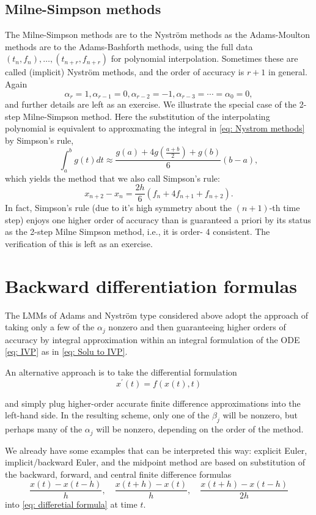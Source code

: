 \subsection{Milne-Simpson methods}
The Milne-Simpson methods are to the Nystr\"om methods as the Adams-Moulton methods are to the Adams-Bashforth methods, using the full data $\left(t_n, f_n\right), \ldots,\left(t_{n+r}, f_{n+r}\right)$ for polynomial interpolation. Sometimes these are called (implicit) Nystr\"om methods, and the order of accuracy is $r+1$ in general. Again
$$
\alpha_r=1, \alpha_{r-1}=0, \alpha_{r-2}=-1, \alpha_{r-3}=\cdots=\alpha_0=0,
$$
and further details are left as an exercise. We illustrate the special case of the 2-step Milne-Simpson method. Here the substitution of the interpolating polynomial is equivalent to approxmating the integral in \eqref{eq: Nystrom methods} by Simpson's rule,
$$
\int_a^b g(t) d t \approx \frac{g(a)+4 g\left(\frac{a+b}{2}\right)+g(b)}{6}(b-a),
$$
which yields the method that we also call Simpson's rule:
$$
x_{n+2}-x_n=\frac{2 h}{6}\left(f_n+4 f_{n+1}+f_{n+2}\right) .
$$
In fact, Simpson's rule (due to it's high symmetry about the $(n+1)$-th time step) enjoys one higher order of accuracy than is guaranteed a priori by its status as the 2-step Milne Simpson method, i.e., it is order- 4 consistent. The verification of this is left as an exercise.

\section{Backward differentiation formulas}
The LMMs of Adams and Nyström type considered above adopt the approach of taking only a few of the $\alpha_j$ nonzero and then guaranteeing higher orders of accuracy by integral approximation within an integral formulation of the ODE \eqref{eq: IVP} as in \eqref{eq: Solu to IVP}. 

An alternative approach is to take the differential formulation
\begin{equation}
\label{eq: differetial formula}
    x^{\prime}(t)=f(x(t), t)
\end{equation}

and simply plug higher-order accurate finite difference approximations into the left-hand side. In the resulting scheme, only one of the $\beta_j$ will be nonzero, but perhaps many of the $\alpha_j$ will be nonzero, depending on the order of the method. 

We already have some examples that can be interpreted this way: explicit Euler, implicit/backward Euler, and the midpoint method are based on substitution of the backward, forward, and central finite difference formulas
$$
\frac{x(t)-x(t-h)}{h}, \quad \frac{x(t+h)-x(t)}{h}, \quad \frac{x(t+h)-x(t-h)}{2 h}
$$
into \eqref{eq: differetial formula} at time $ t $.  


